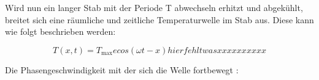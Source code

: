       Wird nun ein langer Stab mit der Periode T abwechseln erhitzt und abgekühlt, breitet sich eine räumliche und zeitliche Temperaturwelle im Stab aus. 
      Diese kann wie folgt beschrieben werden: 

      \begin{equation}
      T(x,t) = T_\text{max} e cos(\omega t - x) hier fehlt was xxxxxxxxxx
        \label{eqn:temperaturwelle}
      \end{equation}  

      Die Phasengeschwindigkeit mit der sich die Welle fortbewegt :


